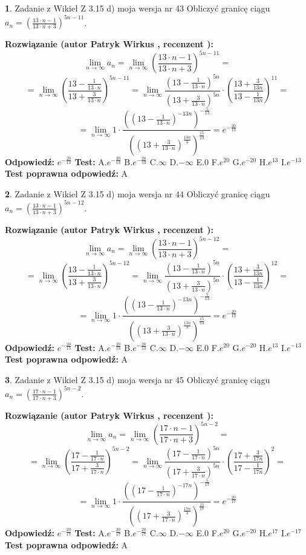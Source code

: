 \documentclass[12pt, a4paper]{article}
\theoremstyle{definition} %
\newtheorem{zad}{}
\newcommand{\zadStart}[1]{\begin{zad}#1\newline}
\newcommand{\zadStop}{\end{zad}}
\newcommand{\rozwStart}[2]{\noindent \textbf{Rozwiązanie (autor #1 , recenzent #2): }\newline}
\newcommand{\rozwStop}{\newline}
\newcommand{\odpStart}{\noindent \textbf{Odpowiedź:}\newline}
\newcommand{\odpStop}{\newline}
\newcommand{\testStart}{\noindent \textbf{Test:}\newline}
\newcommand{\testStop}{\newline}
\newcommand{\kluczStart}{\noindent \textbf{Test poprawna odpowiedź:}\newline}
\newcommand{\kluczStop}{\newline}
\begin{document}
\zadStart{Zadanie z Wikieł Z 3.15 d) moja wersja nr 43}
Obliczyć granicę ciągu $a_{n}=(\frac{13\cdot n - 1}{13 \cdot n + 3})^{5n-11}$.
\zadStop
\rozwStart{Patryk Wirkus}{}
$$\lim\limits_{n\to\infty} a_{n} = \lim\limits_{n\to\infty}(\frac{13\cdot n - 1}{13 \cdot n + 3})^{5n-11}=$$
$$=\lim\limits_{n\to\infty}(\frac{13 - \frac{1}{13\cdot n}}{13 + \frac{3}{13 \cdot n}})^{5n-11}=\lim\limits_{n\to\infty}\frac{(13 - \frac{1}{13\cdot n})^{5n}}{(13 + \frac{3}{13\cdot n})^{5n}} \cdot (\frac{13+\frac{3}{13n}}{13-\frac{1}{13n}})^{11}=$$
$$=\lim\limits_{n\to\infty} 1 \cdot \frac{((13-\frac{1}{13 \cdot n})^{-13n})^{-\frac{5}{13}}}{((13+\frac{3}{13 \cdot n})^{\frac{13n}{3}})^{\frac{15}{13}}} =e^{-\frac{20}{13}}$$
\rozwStop
\odpStart
$e^{-\frac{20}{13}}$
\odpStop
\testStart
A.$ e^{-\frac{20}{13}}$
B.$ e^{-\frac{20}{13}}$
C.$\infty$
D.$-\infty$
E.$0$
F.$e^{20}$
G.$e^{-20}$
H.$e^{13}$
I.$e^{-13}$
\testStop
\kluczStart
A
\kluczStop



\zadStart{Zadanie z Wikieł Z 3.15 d) moja wersja nr 44}
Obliczyć granicę ciągu $a_{n}=(\frac{13\cdot n - 1}{13 \cdot n + 3})^{5n-12}$.
\zadStop
\rozwStart{Patryk Wirkus}{}
$$\lim\limits_{n\to\infty} a_{n} = \lim\limits_{n\to\infty}(\frac{13\cdot n - 1}{13 \cdot n + 3})^{5n-12}=$$
$$=\lim\limits_{n\to\infty}(\frac{13 - \frac{1}{13\cdot n}}{13 + \frac{3}{13 \cdot n}})^{5n-12}=\lim\limits_{n\to\infty}\frac{(13 - \frac{1}{13\cdot n})^{5n}}{(13 + \frac{3}{13\cdot n})^{5n}} \cdot (\frac{13+\frac{3}{13n}}{13-\frac{1}{13n}})^{12}=$$
$$=\lim\limits_{n\to\infty} 1 \cdot \frac{((13-\frac{1}{13 \cdot n})^{-13n})^{-\frac{5}{13}}}{((13+\frac{3}{13 \cdot n})^{\frac{13n}{3}})^{\frac{15}{13}}} =e^{-\frac{20}{13}}$$
\rozwStop
\odpStart
$e^{-\frac{20}{13}}$
\odpStop
\testStart
A.$ e^{-\frac{20}{13}}$
B.$ e^{-\frac{20}{13}}$
C.$\infty$
D.$-\infty$
E.$0$
F.$e^{20}$
G.$e^{-20}$
H.$e^{13}$
I.$e^{-13}$
\testStop
\kluczStart
A
\kluczStop



\zadStart{Zadanie z Wikieł Z 3.15 d) moja wersja nr 45}
Obliczyć granicę ciągu $a_{n}=(\frac{17\cdot n - 1}{17 \cdot n + 3})^{5n-2}$.
\zadStop
\rozwStart{Patryk Wirkus}{}
$$\lim\limits_{n\to\infty} a_{n} = \lim\limits_{n\to\infty}(\frac{17\cdot n - 1}{17 \cdot n + 3})^{5n-2}=$$
$$=\lim\limits_{n\to\infty}(\frac{17 - \frac{1}{17\cdot n}}{17 + \frac{3}{17 \cdot n}})^{5n-2}=\lim\limits_{n\to\infty}\frac{(17 - \frac{1}{17\cdot n})^{5n}}{(17 + \frac{3}{17\cdot n})^{5n}} \cdot (\frac{17+\frac{3}{17n}}{17-\frac{1}{17n}})^{2}=$$
$$=\lim\limits_{n\to\infty} 1 \cdot \frac{((17-\frac{1}{17 \cdot n})^{-17n})^{-\frac{5}{17}}}{((17+\frac{3}{17 \cdot n})^{\frac{17n}{3}})^{\frac{15}{17}}} =e^{-\frac{20}{17}}$$
\rozwStop
\odpStart
$e^{-\frac{20}{17}}$
\odpStop
\testStart
A.$ e^{-\frac{20}{17}}$
B.$ e^{-\frac{20}{17}}$
C.$\infty$
D.$-\infty$
E.$0$
F.$e^{20}$
G.$e^{-20}$
H.$e^{17}$
I.$e^{-17}$
\testStop
\kluczStart
A
\kluczStop
\end{document}
